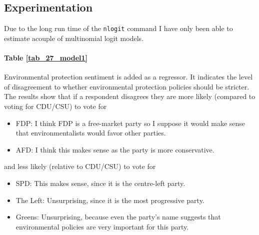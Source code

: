             
            
            
            
            
    
    \subsection{Experimentation}
    Due to the long run time of the \texttt{nlogit} command I have only been able to estimate  acouple of multinomial logit models. 
    
    \paragraph{Table \ref{tab_27_model1}} Environmental protection sentiment is added as a regressor. It indicates the level of disagreement to whether environmental protection policies should be stricter. The results show that if a respondent disagrees they are more likely (compared to voting for CDU/CSU) to vote for
    \begin{itemize}
        \item FDP: I think FDP is a free-market party so I suppose it would make sense that environmentalists would favor other parties.
        \item AFD: I think this makes sense as the party is more conservative.
    \end{itemize}
    and less likely (relative to CDU/CSU) to vote for
    \begin{itemize}
        \item SPD: This makes sense, since it is the centre-left party.
        \item The Left: Unsurprising, since it is the most progressive party.
        \item Greens: Unsurprising, because even the party's name suggests that environmental policies are very important for this party.
    \end{itemize}
    
    
